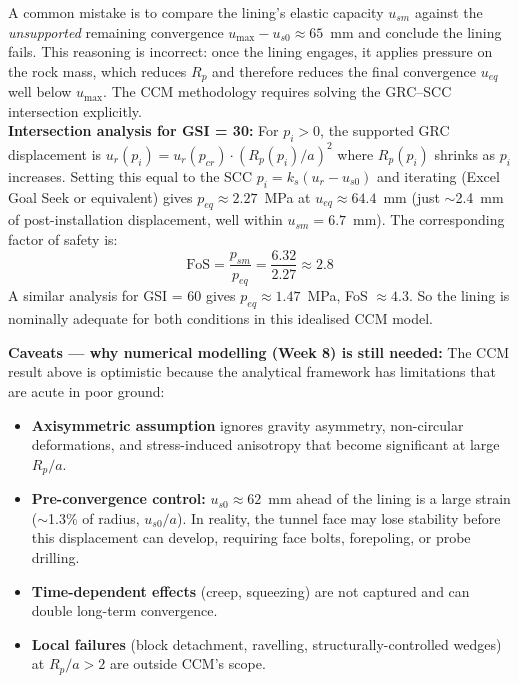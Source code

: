 \documentclass[a4paper,12pt]{article}
\begin{document}
\begin{warnbox}[GSI = 30 — solving the GRC--SCC intersection]
A common mistake is to compare the lining's elastic capacity $u_{sm}$ against the \textit{unsupported} remaining convergence $u_{\max} - u_{s0} \approx 65$~mm and conclude the lining fails. This reasoning is incorrect: once the lining engages, it applies pressure on the rock mass, which reduces $R_p$ and therefore reduces the final convergence $u_{eq}$ well below $u_{\max}$. The CCM methodology requires solving the GRC--SCC intersection explicitly.\\[4pt]

\textbf{Intersection analysis for GSI = 30:} For $p_i > 0$, the supported GRC displacement is $u_r(p_i) = u_r(p_{cr}) \cdot (R_p(p_i)/a)^2$ where $R_p(p_i)$ shrinks as $p_i$ increases. Setting this equal to the SCC $p_i = k_s(u_r - u_{s0})$ and iterating (Excel Goal Seek or equivalent) gives $p_{eq} \approx 2.27$~MPa at $u_{eq} \approx 64.4$~mm (just $\sim$2.4~mm of post-installation displacement, well within $u_{sm} = 6.7$~mm). The corresponding factor of safety is:
\[
\mathrm{FoS} = \frac{p_{sm}}{p_{eq}} = \frac{6.32}{2.27} \approx 2.8
\]
A similar analysis for GSI = 60 gives $p_{eq} \approx 1.47$~MPa, FoS $\approx 4.3$. So the lining is nominally adequate for both conditions in this idealised CCM model.

\textbf{Caveats — why numerical modelling (Week 8) is still needed:} The CCM result above is optimistic because the analytical framework has limitations that are acute in poor ground:
\begin{itemize}[nosep]
    \item \textbf{Axisymmetric assumption} ignores gravity asymmetry, non-circular deformations, and stress-induced anisotropy that become significant at large $R_p/a$.
    \item \textbf{Pre-convergence control:} $u_{s0} \approx 62$~mm ahead of the lining is a large strain ($\sim$1.3\% of radius, $u_{s0}/a$). In reality, the tunnel face may lose stability before this displacement can develop, requiring face bolts, forepoling, or probe drilling.
    \item \textbf{Time-dependent effects} (creep, squeezing) are not captured and can double long-term convergence.
    \item \textbf{Local failures} (block detachment, ravelling, structurally-controlled wedges) at $R_p/a > 2$ are outside CCM's scope.
\end{itemize}


\end{warnbox}
\end{document}
